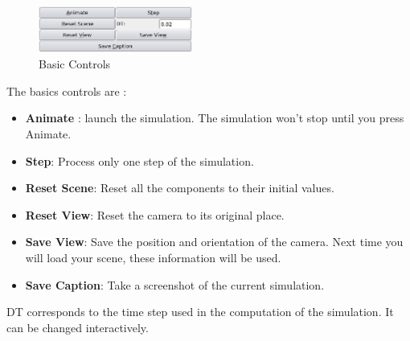 \par

\begin{figure}
	\centering
		\includegraphics[width=0.45\textwidth]{GUI/GUI_basic.png}
	\caption{Basic Controls}
\end{figure}
\vspace{20mm}
The basics controls are :
\begin{itemize}
 \item {\bf Animate} : launch the simulation. The simulation won't stop until you press Animate.
 \item {\bf Step}: Process only one step of the simulation. 
 \item {\bf Reset Scene}: Reset all the components to their initial values.
 \item {\bf Reset View}: Reset the camera to its original place.
 \item {\bf Save View}: Save the position and orientation of the camera. Next time you will load your scene, these information will be used.
 \item {\bf Save Caption}: Take a screenshot of the current simulation.
\end{itemize}

DT corresponds to the time step used in the computation of the simulation. It can be changed interactively.










